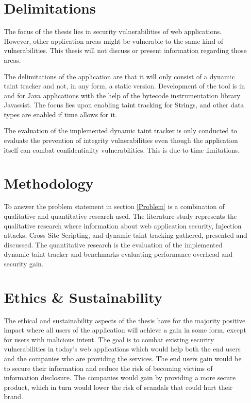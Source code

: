 \section{Delimitations}
\label{Delimitations}
The focus of the thesis lies in security vulnerabilities of web applications. However, other application areas might be vulnerable to the same kind of vulnerabilities. This thesis will not discuss or present information regarding those areas.

The delimitations of the application are that it will only consist of a dynamic taint tracker and not, in any form, a static version. Development of the tool is in and for Java applications with the help of the bytecode instrumentation library Javassist. The focus lies upon enabling taint tracking for Strings, and other data types are enabled if time allows for it.

The evaluation of the implemented dynamic taint tracker is only conducted to evaluate the prevention of integrity vulnerabilities even though the application itself can combat confidentiality vulnerabilities. This is due to time limitations.



\section{Methodology}
\label{Methodology}
To answer the problem statement in section \ref{Problem} is a combination of qualitative and quantitative research used. The literature study represents the qualitative research where information about web application security, Injection attacks, Cross-Site Scripting, and dynamic taint tracking gathered, presented and discussed. The quantitative research is the evaluation of the implemented dynamic taint tracker and benchmarks evaluating performance overhead and security gain.



\section{Ethics \& Sustainability}
\label{Structure}
The ethical and sustainability aspects of the thesis have for the majority positive impact where all users of the application will achieve a gain in some form, except for users with malicious intent. The goal is to combat existing security vulnerabilities in today's web applications which would help both the end users and the companies who are providing the services. The end users gain would be to secure their information and reduce the risk of becoming victims of information disclosure. The companies would gain by providing a more secure product, which in turn would lower the risk of scandals that could hurt their brand. 

